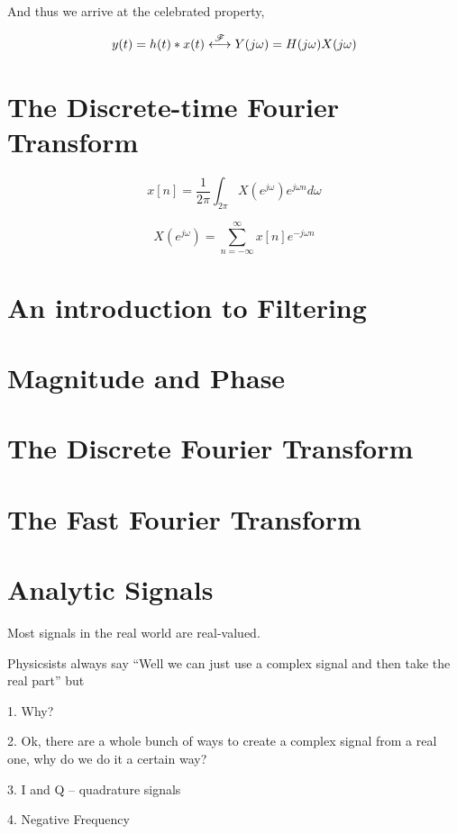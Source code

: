 And thus we arrive at the celebrated property, 


\[
y(t) = h(t) * x(t) \stackrel{\mathscr{F}}{\longleftrightarrow} Y(j\omega) = H(j\omega) X(j\omega)  
\]



\section{The Discrete-time Fourier Transform}
\[
x[n] = \frac{1}{2\pi} \int_{2\pi} X(e^{j\omega}) e^{j\omega n} d\omega
\]

\[
X(e^{j\omega}) = \sum_{n=-\infty}^{\infty} x[n] e^{-j \omega n}
\]


\section{An introduction to Filtering}





\section{Magnitude and Phase}



\section{The Discrete Fourier Transform}


\section{The Fast Fourier Transform}


\section{Analytic Signals}
Most signals in the real world are real-valued. 

Physicsists always say ``Well we can just use a complex signal and
then take the real part'' but

1. Why? 

2. Ok, there are a whole bunch of ways to create a complex signal from
a real one, why do we do it a certain way? 

3. I and Q -- quadrature signals

4. Negative Frequency





